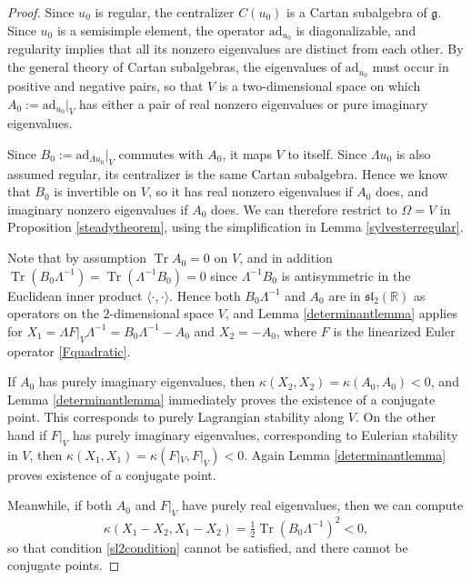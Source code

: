 \documentclass[oneside, 11pt]{amsart}
\numberwithin{equation}{section}
\DeclareMathOperator{\Tr}{Tr}
\newcommand{\ad}{\mathrm{ad}}
\newcommand{\subby}{\Omega}
\newcommand{\simpkill}{\kappa}
\newcommand{\eulerop}{F}
\newcommand{\adop}{A}
\newcommand{\adlambop}{B}
\newcommand{\mattyone}{X_1}
\newcommand{\mattytwo}{X_2}
\begin{document}
\begin{proof}
    Since $u_0$ is regular, the centralizer $C(u_0)$ is a Cartan subalgebra of $\mathfrak{g}$. Since $u_0$ is a semisimple element, the operator $\ad_{u_0}$ is diagonalizable, and regularity implies that all its nonzero eigenvalues are distinct from each other. By the general theory of Cartan subalgebras, the eigenvalues of $\ad_{u_0}$ must occur in positive and negative pairs, so that $V$ is a two-dimensional space on which $\adop_0:=\ad_{u_0}\vert_V$ has either a pair of real nonzero eigenvalues or pure imaginary eigenvalues.

    Since $\adlambop_0:=\ad_{\Lambda u_0}\vert_V$ commutes with $\adop_0$, it maps $V$ to itself. Since $\Lambda u_0$ is also assumed regular, its centralizer is the same Cartan subalgebra. Hence we know that $\adlambop_0$ is invertible on $V$, so it has real nonzero eigenvalues if $\adop_0$ does, and imaginary nonzero eigenvalues if $\adop_0$ does. We can therefore restrict to $\subby=V$ in Proposition \ref{steadytheorem}, using the simplification in Lemma \ref{sylvesterregular}. 

    Note that by assumption $\Tr{\adop_0}=0$ on $V$, and in addition $\Tr(\adlambop_0\Lambda^{-1}) = \Tr(\Lambda^{-1}\adlambop_0)=0$ since $\Lambda^{-1}\adlambop_0$ is antisymmetric in the Euclidean inner product $\langle \cdot, \cdot\rangle$. Hence both $\adlambop_0\Lambda^{-1}$ and $\adop_0$ are in $\mathfrak{sl}_2(\mathbb{R})$ as operators on the $2$-dimensional space $V$, and Lemma \ref{determinantlemma} applies for $\mattyone=\Lambda \eulerop|_V \Lambda^{-1} = \adlambop_0\Lambda^{-1}-\adop_0$ and $\mattytwo=-\adop_0$, where $\eulerop$ is the linearized Euler operator \eqref{Fquadratic}.

    If $\adop_0$ has purely imaginary eigenvalues, then $\simpkill(\mattytwo,\mattytwo) = \simpkill(\adop_0,\adop_0) < 0$, and Lemma \ref{determinantlemma} immediately proves the existence of a conjugate point. This corresponds to purely Lagrangian stability along $V$. On the other hand if $\eulerop|_V$ has purely imaginary eigenvalues, corresponding to Eulerian stability in $V$, then  $\simpkill(\mattyone,\mattyone)=\simpkill(\eulerop|_V,\eulerop|_V)<0$. Again Lemma \ref{determinantlemma} proves existence of a conjugate point. 
      
 Meanwhile, if both $\adop_0$ and $\eulerop|_V$ have purely real eigenvalues, then 
 we can compute
 $$ \simpkill(\mattyone-\mattytwo,\mattyone-\mattytwo) = \tfrac{1}{2} \Tr{(\adlambop_0\Lambda^{-1})^2} < 0,$$
 so that condition \eqref{sl2condition} cannot be satisfied, and there cannot be conjugate points.
\end{proof}
\end{document}

